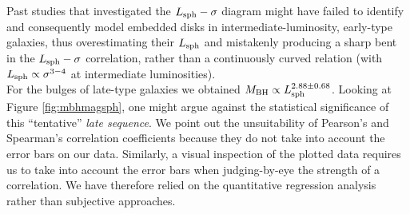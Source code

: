 \documentclass[preprint2]{emulateapj}
\begin{document}
Past studies that investigated the $L_{\rm sph} - \sigma$ diagram might have failed to identify and consequently model embedded disks 
in intermediate-luminosity, early-type galaxies, thus overestimating their $L_{\rm sph}$ 
and mistakenly producing a sharp bent in the $L_{\rm sph} - \sigma$ correlation, rather than a continuously curved relation 
(with $L_{\rm sph} \propto \sigma^{3-4}$ at intermediate luminosities). \\
For the bulges of late-type galaxies we obtained $M_{\rm BH} \propto L_{\rm sph}^{2.88 \pm 0.68}$. 
Looking at Figure \ref{fig:mbhmagsph}, one might argue against the statistical significance of this ``tentative'' \emph{late sequence}. 
We point out the unsuitability of Pearson's and Spearman's correlation coefficients because 
they do not take into account the error bars on our data.
Similarly, a visual inspection of the plotted data requires us to take into account the error bars 
when judging-by-eye the strength of a correlation. 
We have therefore relied on the quantitative regression analysis rather than subjective approaches.
\end{document}

